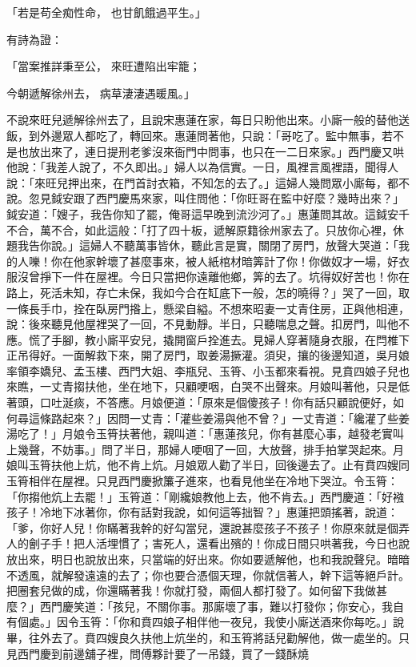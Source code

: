 「若是苟全痴性命，  也甘飢餓過平生。」

有詩為證：

「當案推詳秉至公，  來旺遭陷出牢籠；

今朝遞解徐州去，  病草淒淒遇暖風。」

不說來旺兒遞解徐州去了，且說宋惠蓮在家，每日只盼他出來。小廝一般的替他送飯，到外邊眾人都吃了，轉回來。惠蓮問著他，只說：「哥吃了。監中無事，若不是也放出來了，連日提刑老爹沒來衙門中問事，也只在一二日來家。」西門慶又哄他說：「我差人說了，不久即出。」婦人以為信實。一日，風裡言風裡語，聞得人說：「來旺兒押出來，在門首討衣箱，不知怎的去了。」這婦人幾問眾小廝每，都不說。忽見鉞安跟了西門慶馬來家，叫住問他：「你旺哥在監中好麼？幾時出來？」鉞安道：「嫂子，我告你知了罷，俺哥這早晚到流沙河了。」惠蓮問其故。這鉞安千不合，萬不合，如此這般：「打了四十板，遞解原籍徐州家去了。只放你心裡，休題我告你說。」這婦人不聽萬事皆休，聽此言是實，關閉了房門，放聲大哭道：「我的人嚛！你在他家幹壞了甚麼事來，被人紙棺材暗筭計了你！你做奴才一場，好衣服沒曾掙下一件在屋裡。今日只當把你遠離他鄉，筭的去了。坑得奴好苦也！你在路上，死活未知，存亡未保，我如今合在缸底下一般，怎的曉得？」哭了一回，取一條長手巾，拴在臥房門揝上，懸梁自縊。不想來昭妻一丈青住房，正與他相連，說：後來聽見他屋裡哭了一回，不見動靜。半日，只聽喘息之聲。扣房門，叫他不應。慌了手腳，教小廝平安兒，撬開窗戶拴進去。見婦人穿著隨身衣服，在閂椎下正吊得好。一面解救下來，開了房門，取姜湯撅灌。須臾，攘的後邊知道，吳月娘率領李嬌兒、孟玉樓、西門大姐、李瓶兒、玉筲、小玉都來看視。見賁四娘子兒也來瞧，一丈青搊扶他，坐在地下，只顧哽咽，白哭不出聲來。月娘叫著他，只是低著頭，口吐涎痰，不答應。月娘便道：「原來是個傻孩子！你有話只顧說便好，如何尋這條路起來？」因問一丈青：「灌些姜湯與他不曾？」一丈青道：「纔灌了些姜湯吃了！」月娘令玉筲扶著他，親叫道：「惠蓮孩兒，你有甚麼心事，越發老實叫上幾聲，不妨事。」問了半日，那婦人哽咽了一回，大放聲，排手拍掌哭起來。月娘叫玉筲扶他上炕，他不肯上炕。月娘眾人勸了半日，回後邊去了。止有賁四嫂同玉筲相伴在屋裡。只見西門慶掀簾子進來，也看見他坐在冷地下哭泣。令玉筲：「你搊他炕上去罷！」玉筲道：「剛纔娘教他上去，他不肯去。」西門慶道：「好襁孩子！冷地下冰著你，你有話對我說，如何這等拙智？」惠蓮把頭搖著，說道：「爹，你好人兒！你瞞著我幹的好勾當兒，還說甚麼孩子不孩子！你原來就是個弄人的劊子手！把人活埋慣了；害死人，還看出殯的！你成日間只哄著我，今日也說放出來，明日也說放出來，只當端的好出來。你如要遞解他，也和我說聲兒。暗暗不透風，就解發遠遠的去了；你也要合憑個天理，你就信著人，幹下這等絕戶計。把圈套兒做的成，你還瞞著我！你就打發，兩個人都打發了。如何留下我做甚麼？」西門慶笑道：「孩兒，不關你事。那廝壞了事，難以打發你；你安心，我自有個處。」因令玉筲：「你和賁四娘子相伴他一夜兒，我使小廝送酒來你每吃。」說畢，往外去了。賁四嫂良久扶他上炕坐的，和玉筲將話兒勸解他，做一處坐的。只見西門慶到前邊舖子裡，問傅夥計要了一吊錢，買了一錢酥燒 